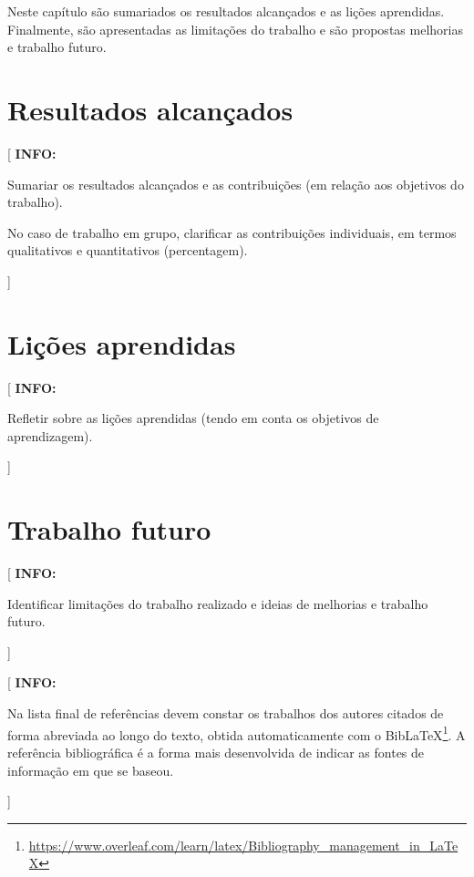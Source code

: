 \documentclass[11pt,a4paper]{report}
\newcommand{\class}[1]{{\normalfont\sffamily #1\/}}
\newenvironment{info}[1]{\vspace*{6mm}\color{blue}[ \textbf{INFO:} \begin{em} #1}{\vspace*{3mm}\end{em} ]}
\begin{document}
Neste capítulo são sumariados os resultados alcançados e as lições
aprendidas.
Finalmente, são apresentadas as limitações do trabalho e são propostas
melhorias e trabalho futuro. 

\section{Resultados alcançados}

\begin{info}
Sumariar os resultados alcançados e as contribuições (em
relação aos objetivos do trabalho).

No caso de trabalho em grupo, clarificar as contribuições individuais,
em termos qualitativos e quantitativos (percentagem). 
\end{info}

\lipsum[11]

\section{Lições aprendidas}

\begin{info}
Refletir sobre as lições aprendidas (tendo em conta os objetivos de aprendizagem).
\end{info}

\lipsum[12]

\section{Trabalho futuro}

\begin{info}
Identificar limitações do trabalho realizado e ideias de melhorias e trabalho futuro.
\end{info}


\renewcommand{\bibname}{Referências bibliográficas}
\printbibliography
{}  %

\begin{info}
Na lista final de referências devem constar os trabalhos dos autores
citados de forma abreviada ao longo do texto, obtida automaticamente
com o \class{BibLaTeX}\footnote{\url{https://www.overleaf.com/learn/latex/Bibliography_management_in_LaTeX}}.
A referência bibliográfica é a forma mais desenvolvida de indicar as
fontes de informação em que se baseou. 
\end{info}
\end{document}
